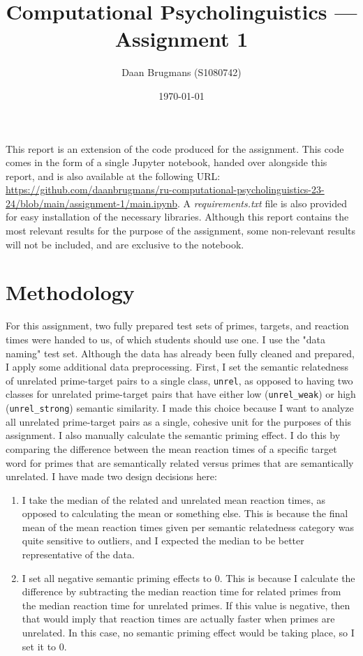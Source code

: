\documentclass{IEEEtran}
\begin{document}
\title{Computational Psycholinguistics --- Assignment 1}
\author{Daan Brugmans (S1080742)}
\date{\today}

\maketitle

This report is an extension of the code produced for the assignment.
This code comes in the form of a single Jupyter notebook, handed over alongside this report, and is also available at the following URL: \url{https://github.com/daanbrugmans/ru-computational-psycholinguistics-23-24/blob/main/assignment-1/main.ipynb}.
A \textit{requirements.txt} file is also provided for easy installation of the necessary libraries.
Although this report contains the most relevant results for the purpose of the assignment, some non-relevant results will not be included, and are exclusive to the notebook.

\section{Methodology}
For this assignment, two fully prepared test sets of primes, targets, and reaction times were handed to us, of which students should use one.
I use the "data naming" test set.
Although the data has already been fully cleaned and prepared, I apply some additional data preprocessing.
First, I set the semantic relatedness of unrelated prime-target pairs to a single class, \texttt{unrel}, as opposed to having two classes for unrelated prime-target pairs that have either low (\texttt{unrel\_weak}) or high (\texttt{unrel\_strong}) semantic similarity.
I made this choice because I want to analyze all unrelated prime-target pairs as a single, cohesive unit for the purposes of this assignment.
I also manually calculate the semantic priming effect.
I do this by comparing the difference between the mean reaction times of a specific target word for primes that are semantically related versus primes that are semantically unrelated.
I have made two design decisions here:
\begin{enumerate}
    \item I take the median of the related and unrelated mean reaction times, as opposed to calculating the mean or something else.
    This is because the final mean of the mean reaction times given per semantic relatedness category was quite sensitive to outliers, and I expected the median to be better representative of the data.
    \item I set all negative semantic priming effects to 0.
    This is because I calculate the difference by subtracting the median reaction time for related primes from the median reaction time for unrelated primes.
    If this value is negative, then that would imply that reaction times are actually faster when primes are unrelated.
    In this case, no semantic priming effect would be taking place, so I set it to 0.
\end{enumerate}
\end{document}
